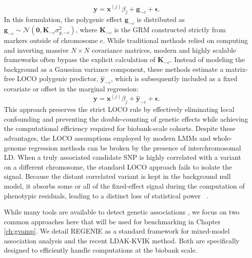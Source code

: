 \begin{equation}
    \bm{y} = \bm{x}^{(j)} \beta_j + \bm{g}_{-c} + \bm{\epsilon}.
\end{equation}
In this formulation, the polygenic effect $\bm{g}_{-c}$ is distributed as $\bm{g}_{-c} \sim \mathcal{N}(\bm{0}, \bm{K}_{-c} \sigma_{g,-c}^2)$, where $\bm{K}_{-c}$ is the GRM constructed strictly from markers outside of chromosome $c$. While traditional methods relied on computing and inverting massive $N \times N$ covariance matrices, modern and highly scalable frameworks often bypass the explicit calculation of $\bm{K}_{-c}$. Instead of modeling the background as a Gaussian variance component, these methods estimate a matrix-free LOCO polygenic predictor, $\bm{\hat{y}}_{-c}$, which is subsequently included as a fixed covariate or offset in the marginal regression:
\begin{equation}
    \bm{y} = \bm{x}^{(j)} \beta_j + \bm{\hat{y}}_{-c} + \bm{\epsilon}.
\end{equation}
This approach preserves the strict LOCO rule by effectively eliminating local confounding and preventing the double-counting of genetic effects while achieving the computational efficiency required for biobank-scale cohorts.
Despite these advantages, the LOCO assumptions employed by modern LMMs and whole-genome regression methods can be broken by the presence of interchromosomal LD. When a truly associated candidate SNP is highly correlated with a variant on a different chromosome, the standard LOCO approach fails to isolate the signal. Because the distant correlated variant is kept in the background null model, it absorbs some or all of the fixed-effect signal during the computation of phenotypic residuals, leading to a distinct loss of statistical power ~\cite{regenie}.

While many tools are available to detect genetic associations \cite{bolt,fastGWA2019,SAIGE, regenie, hof2024ldak}, we focus on two common approaches here that will be used for benchmarking in Chapter \ref{ch:gvamp}. We detail REGENIE \cite{regenie} as a standard framework for mixed-model association analysis and the recent LDAK-KVIK \cite{hof2024ldak} method. Both are specifically designed to efficiently handle computations at the biobank scale.

